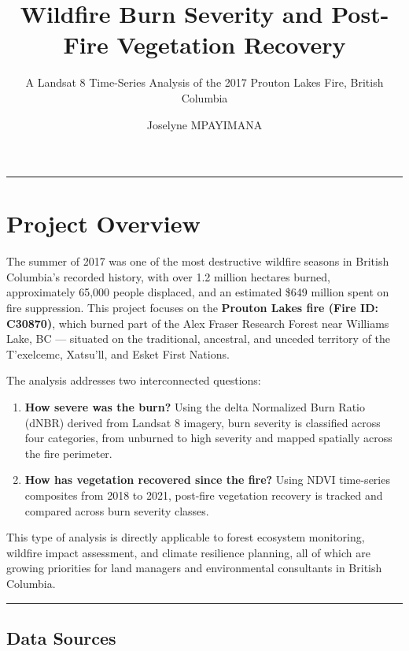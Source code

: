 \documentclass[
]{article}
\title{Wildfire Burn Severity and Post-Fire Vegetation Recovery}
\subtitle{A Landsat 8 Time-Series Analysis of the 2017 Prouton Lakes
Fire, British Columbia}
\author{Joselyne MPAYIMANA}
\date{}
\begin{document}
\maketitle

{
\setcounter{tocdepth}{2}
\tableofcontents
}
\begin{center}\rule{0.5\linewidth}{0.5pt}\end{center}

\section{Project Overview}\label{project-overview}

The summer of 2017 was one of the most destructive wildfire seasons in
British Columbia's recorded history, with over 1.2 million hectares
burned, approximately 65,000 people displaced, and an estimated \$649
million spent on fire suppression. This project focuses on the
\textbf{Prouton Lakes fire (Fire ID: C30870)}, which burned part of the
Alex Fraser Research Forest near Williams Lake, BC --- situated on the
traditional, ancestral, and unceded territory of the T'exelcemc,
Xatsu'll, and Esket First Nations.

The analysis addresses two interconnected questions:

\begin{enumerate}
\def\labelenumi{\arabic{enumi}.}
\item
  \textbf{How severe was the burn?} Using the delta Normalized Burn
  Ratio (dNBR) derived from Landsat 8 imagery, burn severity is
  classified across four categories, from unburned to high severity and
  mapped spatially across the fire perimeter.
\item
  \textbf{How has vegetation recovered since the fire?} Using NDVI
  time-series composites from 2018 to 2021, post-fire vegetation
  recovery is tracked and compared across burn severity classes.
\end{enumerate}

This type of analysis is directly applicable to forest ecosystem
monitoring, wildfire impact assessment, and climate resilience planning,
all of which are growing priorities for land managers and environmental
consultants in British Columbia.

\begin{center}\rule{0.5\linewidth}{0.5pt}\end{center}

\subsection{Data Sources}\label{data-sources}
\end{document}
